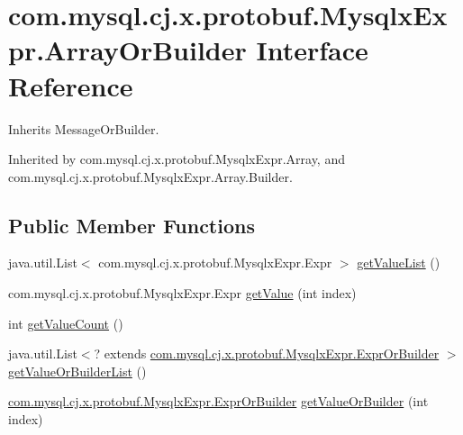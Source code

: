 \hypertarget{interfacecom_1_1mysql_1_1cj_1_1x_1_1protobuf_1_1_mysqlx_expr_1_1_array_or_builder}{}\section{com.\+mysql.\+cj.\+x.\+protobuf.\+Mysqlx\+Expr.\+Array\+Or\+Builder Interface Reference}
\label{interfacecom_1_1mysql_1_1cj_1_1x_1_1protobuf_1_1_mysqlx_expr_1_1_array_or_builder}


Inherits Message\+Or\+Builder.



Inherited by com.\+mysql.\+cj.\+x.\+protobuf.\+Mysqlx\+Expr.\+Array, and com.\+mysql.\+cj.\+x.\+protobuf.\+Mysqlx\+Expr.\+Array.\+Builder.

\subsection*{Public Member Functions}
\begin{DoxyCompactItemize}
\item 
java.\+util.\+List$<$ com.\+mysql.\+cj.\+x.\+protobuf.\+Mysqlx\+Expr.\+Expr $>$ \mbox{\hyperlink{interfacecom_1_1mysql_1_1cj_1_1x_1_1protobuf_1_1_mysqlx_expr_1_1_array_or_builder_aad3d31b54f95156b960c030d5b6c689e}{get\+Value\+List}} ()
\item 
com.\+mysql.\+cj.\+x.\+protobuf.\+Mysqlx\+Expr.\+Expr \mbox{\hyperlink{interfacecom_1_1mysql_1_1cj_1_1x_1_1protobuf_1_1_mysqlx_expr_1_1_array_or_builder_aa8a2af666b781622d3e5e659b2f87c20}{get\+Value}} (int index)
\item 
int \mbox{\hyperlink{interfacecom_1_1mysql_1_1cj_1_1x_1_1protobuf_1_1_mysqlx_expr_1_1_array_or_builder_a9c856051aa56536c3350fa4fd7225d3e}{get\+Value\+Count}} ()
\item 
java.\+util.\+List$<$? extends \mbox{\hyperlink{interfacecom_1_1mysql_1_1cj_1_1x_1_1protobuf_1_1_mysqlx_expr_1_1_expr_or_builder}{com.\+mysql.\+cj.\+x.\+protobuf.\+Mysqlx\+Expr.\+Expr\+Or\+Builder}} $>$ \mbox{\hyperlink{interfacecom_1_1mysql_1_1cj_1_1x_1_1protobuf_1_1_mysqlx_expr_1_1_array_or_builder_a5848db086fca6625e7bab2d9be6b1ea8}{get\+Value\+Or\+Builder\+List}} ()
\item 
\mbox{\hyperlink{interfacecom_1_1mysql_1_1cj_1_1x_1_1protobuf_1_1_mysqlx_expr_1_1_expr_or_builder}{com.\+mysql.\+cj.\+x.\+protobuf.\+Mysqlx\+Expr.\+Expr\+Or\+Builder}} \mbox{\hyperlink{interfacecom_1_1mysql_1_1cj_1_1x_1_1protobuf_1_1_mysqlx_expr_1_1_array_or_builder_ad17f7781d09176e96966aa8457976d76}{get\+Value\+Or\+Builder}} (int index)
\end{DoxyCompactItemize}


